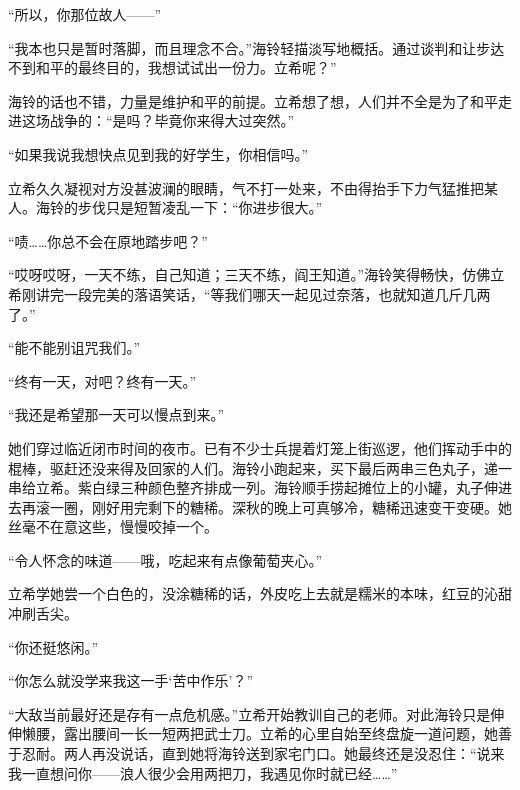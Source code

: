 \documentclass{article}
\begin{document}
“所以，你那位故人——”



“我本也只是暂时落脚，而且理念不合。”海铃轻描淡写地概括。通过谈判和让步达不到和平的最终目的，我想试试出一份力。立希呢？”



海铃的话也不错，力量是维护和平的前提。立希想了想，人们并不全是为了和平走进这场战争的：“是吗？毕竟你来得大过突然。”



“如果我说我想快点见到我的好学生，你相信吗。”



立希久久凝视对方没甚波澜的眼睛，气不打一处来，不由得抬手下力气猛推把某人。海铃的步伐只是短暂凌乱一下：“你进步很大。”



“啧……你总不会在原地踏步吧？”



“哎呀哎呀，一天不练，自己知道；三天不练，阎王知道。”海铃笑得畅快，仿佛立希刚讲完一段完美的落语笑话，“等我们哪天一起见过奈落，也就知道几斤几两了。”



“能不能别诅咒我们。”



“终有一天，对吧？终有一天。”



“我还是希望那一天可以慢点到来。”



她们穿过临近闭市时间的夜市。已有不少士兵提着灯笼上街巡逻，他们挥动手中的棍棒，驱赶还没来得及回家的人们。海铃小跑起来，买下最后两串三色丸子，递一串给立希。紫白绿三种颜色整齐排成一列。海铃顺手捞起摊位上的小罐，丸子伸进去再滚一圈，刚好用完剩下的糖稀。深秋的晚上可真够冷，糖稀迅速变干变硬。她丝毫不在意这些，慢慢咬掉一个。



“令人怀念的味道——哦，吃起来有点像葡萄夹心。”



立希学她尝一个白色的，没涂糖稀的话，外皮吃上去就是糯米的本味，红豆的沁甜冲刷舌尖。



“你还挺悠闲。”



“你怎么就没学来我这一手‘苦中作乐’？”



“大敌当前最好还是存有一点危机感。”立希开始教训自己的老师。对此海铃只是伸伸懒腰，露出腰间一长一短两把武士刀。立希的心里自始至终盘旋一道问题，她善于忍耐。两人再没说话，直到她将海铃送到家宅门口。她最终还是没忍住：“说来我一直想问你——浪人很少会用两把刀，我遇见你时就已经……”
\end{document}

